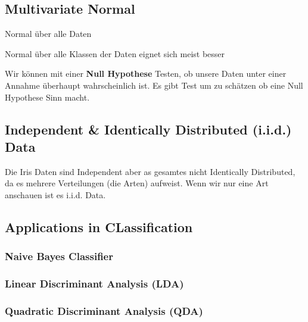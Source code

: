 \documentclass[a4paper]{article}
\begin{document}
\subsection{Multivariate Normal}

Normal über alle Daten

Normal über alle Klassen der Daten eignet sich meist besser

Wir können mit einer \textbf{Null Hypothese} Testen, ob unsere Daten unter einer Annahme überhaupt wahrscheinlich ist. Es gibt Test um zu schätzen ob eine Null Hypothese Sinn macht.


\subsection{Independent \& Identically Distributed (i.i.d.) Data}

Die Iris Daten sind Independent aber as gesamtes nicht Identically Distributed, da es mehrere Verteilungen (die Arten) aufweist. Wenn wir nur eine Art anschauen ist es i.i.d. Data.

\subsection{Applications in CLassification}

\subsubsection{Naive Bayes Classifier}



\subsubsection{Linear Discriminant Analysis (LDA)}



\subsubsection{Quadratic Discriminant Analysis (QDA)}
\end{document}
